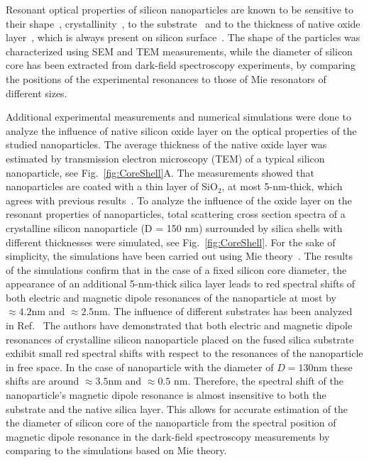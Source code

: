         Resonant optical properties of silicon nanoparticles are known to be sensitive to their shape~\cite{zywietz2015electromagnetic},
        crystallinity~\cite{zywietz2015electromagnetic,dmitriev2016laser}, to the substrate~\cite{miroshnichenko2015substrate} and
        to the thickness of native oxide layer~\cite{zywietz2015electromagnetic, fu2012directional},
        which is always present on silicon surface~\cite{morita1990growth}. The shape of the particles was characterized using
        SEM and TEM measurements, while the diameter of silicon core has been extracted from dark-field spectroscopy experiments, by
        comparing the positions of the experimental resonances to those of Mie resonators of different sizes.

        Additional experimental measurements and numerical simulations were done to analyze the influence of native silicon oxide layer
        on the optical properties of the studied nanoparticles. The average thickness of the native oxide layer was
        estimated by transmission electron microscopy (TEM) of a typical silicon nanoparticle, see Fig.~\ref{fig:CoreShell}A.
        The measurements showed that nanoparticles are coated with a thin layer of SiO$_2$, at most 5-nm-thick, which agrees
        with previous results~\cite{zywietz2015electromagnetic, fu2012directional}.
        To analyze the influence of the oxide layer on the resonant properties of nanoparticles,
        total scattering cross section spectra of a crystalline silicon nanoparticle (D = 150 nm) surrounded by
        silica shells with different thicknesses were simulated, see Fig.~\ref{fig:CoreShell}. For the sake of simplicity, the simulations have been carried out
        using Mie theory~\cite{bohren1983absorption}. The results of the simulations confirm that in the case of a fixed silicon core diameter, the appearance of an additional
        5-nm-thick silica layer leads to red spectral shifts of both electric and magnetic dipole resonances of the
        nanoparticle at most by $≈ 4.2$nm and $≈ 2.5$nm. The influence of different substrates has been analyzed in
        Ref.~\cite{miroshnichenko2015substrate} The authors have demonstrated that both electric and magnetic dipole resonances of
        crystalline silicon nanoparticle
        placed on the fused silica substrate exhibit small red spectral shifts with respect to the resonances of the nanoparticle
        in free space. In the case of nanoparticle with the diameter of $D = 130 $nm these shifts are around $≈ 3.5 $nm and $≈ 0.5$ nm.
        Therefore, the spectral shift of the nanoparticle’s magnetic dipole resonance is almost insensitive to both
        the substrate and the native silica layer. This allows for accurate estimation of the the diameter of silicon core of the nanoparticle
        from the spectral position of magnetic dipole resonance in the dark-field spectroscopy measurements by
        comparing to the simulations based on Mie theory.


